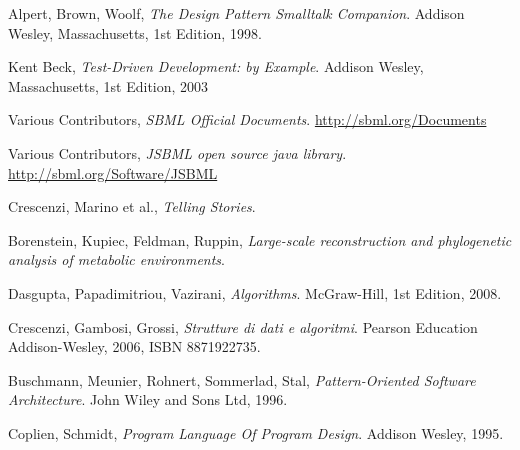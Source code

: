 \begin{thebibliography}{99}

  Alpert, Brown, Woolf,
  \emph{The Design Pattern Smalltalk Companion}.
  Addison Wesley, Massachusetts,
  1st Edition,
  1998.

  Kent Beck,
  \emph{Test-Driven Development: by Example}.
  Addison Wesley, Massachusetts,
  1st Edition,
  2003

  Various Contributors,
  \emph{SBML Official Documents}.
  \url{http://sbml.org/Documents}

 Various Contributors, \emph{JSBML open
    source java library}. \url{http://sbml.org/Software/JSBML}

  Crescenzi, Marino et al.,
  \emph{Telling Stories}.

 Borenstein, Kupiec, Feldman,
  Ruppin, \emph{Large-scale reconstruction and phylogenetic analysis
    of metabolic environments}.

  Dasgupta, Papadimitriou, Vazirani,
  \emph{Algorithms}.
  McGraw-Hill,
  1st Edition,
  2008.

  Crescenzi, Gambosi, Grossi,
  \emph{Strutture di dati e algoritmi}.
  Pearson Education Addison-Wesley, 2006, ISBN 8871922735.

  Buschmann, Meunier, Rohnert, Sommerlad, Stal, 
  \emph{Pattern-Oriented Software Architecture}.
  John Wiley and Sons Ltd, 1996.

  Coplien, Schmidt,
  \emph{Program Language Of Program Design}.
  Addison Wesley, 1995.


\end{thebibliography}